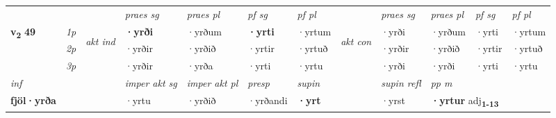 \begin{longtable}[l]{X>{\footnotesize\itshape}llXXXXlXXXX}
 & &   & \textit{praes sg}  & \textit{praes pl}    & \textit{ pf sg} & \textit{pf pl} & & \textit{praes sg}  & \textit{praes pl}    & \textit{pf sg} & \textit{pf pl }  \\ \cmidrule{4-7} \cmidrule{9-12}
 \multirow{2}{*}{{{\textbf{v{\textsubscript{2}}} \Large{\textbf{49}}}}}  & 1p & \multirow{3}{*}{\begin{turn}{90}\textit{akt ind}\end{turn}} & \textbf{·yrði} & ·yrðum & \textbf{·yrti} & ·yrtum & \multirow{3}{*}{\begin{turn}{90}\textit{akt con}\end{turn}} &·yrði & ·yrðum & ·yrti & ·yrtum\\*
 & 2p &  &  ·yrðir  & ·yrðið & ·yrtir & ·yrtuð & & ·yrðir & ·yrðið & ·yrtir & ·yrtuð \\*
 & 3p &  & ·yrðir & ·yrða & ·yrti & ·yrtu & & ·yrði & ·yrði& ·yrti & ·yrtu \\*
\cmidrule{4-7} \cmidrule{9-12}

   {\textit{inf}} & &  & \textit{imper akt sg} & \textit{imper akt pl}   & \textit{presp} & \textit{supin} && \textit{supin refl} & \textit{pp m} \\*
  {\textbf{fjöl\allowbreak ·yrða}} & && ·yrtu  & ·yrðið   & ·yrðandi &  \textbf{·yrt} && ·yrst & \multicolumn{2}{l}{\textbf{·yrtur} adj\textbf{\textsubscript{1-13}}} \\*

\midrule


\end{longtable}

